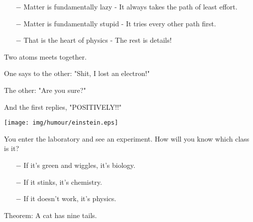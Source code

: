 	\begin{itemize}	 
		\item[$-$] Matter is fundamentally lazy - It always takes the path of least effort.
	
		\item[$-$] Matter is fundamentally stupid - It tries every other path first.
		
		\item[$-$] That is the heart of physics - The rest is details!
	\end{itemize}
	
	\begin{center}\underline{\hspace{5 cm}}\end{center}
	
	Two atoms meets together. 
	
	One says to the other: "Shit, I lost an electron!"
	
	The other: "Are you sure?"
	
	And the first replies, "POSITIVELY!!"
	
	\begin{center}\underline{\hspace{5 cm}}\end{center}

	\begin{center}
	\texttt{[image: img/humour/einstein.eps]}
	\end{center}
	
	\begin{center}\underline{\hspace{5 cm}}\end{center}	
	
	You enter the laboratory and see an experiment. How will you know which class is it?
	
	\begin{itemize}	 
		\item[$-$] If it's green and wiggles, it's biology.
	
		\item[$-$] If it stinks, it's chemistry.
	
		\item[$-$] If it doesn't work, it's physics.
	\end{itemize}
	
	\begin{center}\underline{\hspace{5 cm}}\end{center}	

	Theorem: A cat has nine tails.
	
